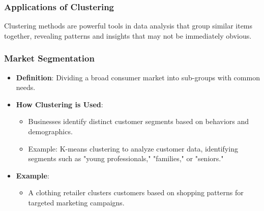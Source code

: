 \documentclass{beamer}
\begin{document}
\begin{frame}[fragile]
    \frametitle{Applications of Clustering}
    Clustering methods are powerful tools in data analysis that group similar items together, revealing patterns and insights that may not be immediately obvious.
\end{frame}

\begin{frame}[fragile]
    \frametitle{Market Segmentation}
    \begin{itemize}
        \item \textbf{Definition}: Dividing a broad consumer market into sub-groups with common needs.
        \item \textbf{How Clustering is Used}:
        \begin{itemize}
            \item Businesses identify distinct customer segments based on behaviors and demographics.
            \item Example: K-means clustering to analyze customer data, identifying segments such as "young professionals," "families," or "seniors."
        \end{itemize}
        \item \textbf{Example}:
        \begin{itemize}
            \item A clothing retailer clusters customers based on shopping patterns for targeted marketing campaigns.
        \end{itemize}
    \end{itemize}
\end{frame}
\end{document}
